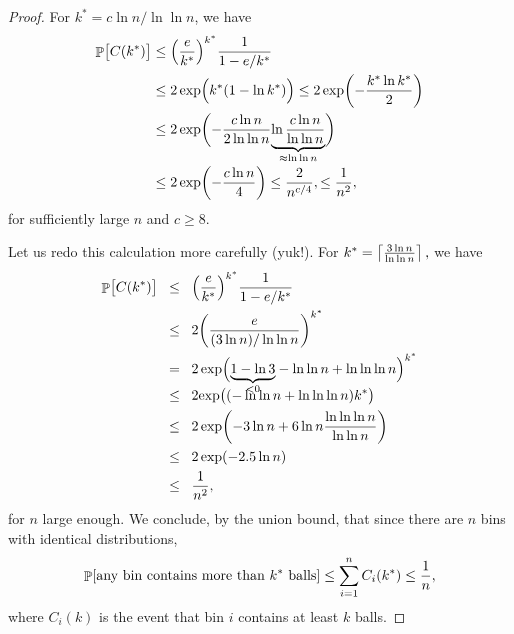 \begin{proof}
    For $k^* = c \ln{n} /\ln \ln n$, we have
    \begin{align*}
      \Prob{\bigl. C\pth{k^*}}%
      &\leq%
        \pth{\bigl.\frac{e}{k^*}}^{k^*} \frac{1}{1-e/{k^*}}%
        \\&\leq%
        2 \exp \pth{\Bigl. k^* \pth{1  - \ln k^* }}
        \leq%
        2 \exp \pth{ - \frac{k^*\ln k^*}{2} }
      \\&%
      \leq%
      2 \exp \pth{ - \frac{c \ln{n}}{2 \ln \ln n}
      \smash{\underbrace{\ln
      \frac{c \ln{n}}{\ln \ln n}}_{\approx \ln \ln n}}}
      \\[0.35cm]&
      \leq %
      2 \exp \pth{ - \frac{c \ln{n}}{4 } }
      \leq %
      \frac{2}{n^{c/4}},
      \leq %
      \frac{1}{n^{2}},
    \end{align*}
    for sufficiently large $n$ and $c\geq 8$. %

    Let us redo this calculation more carefully (yuk!). For
    \begin{math}
        k^* = \left\lceil {
           \tfrac{3 \ln n }{\ln \ln n}
           } \right\rceil,
    \end{math}
    we have
    \begin{align*}
        \Prob{\bigl. C\pth{k^*}}%
        &\LEQ%
        \pth{\frac{e}{k^*}}^{k^*} \frac{1}{1-e/{k^*}}%
        \\&
        \LEQ%
        2 \pth[]{\frac{e}{(3 \ln{n})/\ln \ln n}}^{k^*}%
        \\&
        \EQ%
        2  \,{ \bigl. \exp\pth{\Bigl.
              \smash{\underbrace{1- \ln 3}_{<0}} - \ln \ln {n} + \ln \ln
              \ln {n}}}^{k^*}%
        \\&%
        \LEQ%
        2 \bigl.\exp \pth{\bigl. \pth{ - \ln \ln {n} + \ln \ln \ln
              {n}}{k^*}}
        \\&
        \LEQ%
        2 \exp \pth{-3 \ln n + {6 \ln n} \frac{\ln \ln \ln n}{\ln \ln n}}
        \\&%
        \LEQ%
        2\exp \pth{ -2.5 \ln n}
        \\&
        \LEQ%
        \frac{1}{n^2},
    \end{align*}
    for $n$ large enough. We conclude, by the union bound, that since
    there are $n$ bins with identical distributions,
    \begin{equation*}
        \Prob{\MakeBig \text{any bin contains more than $k^*$
              balls}} %
        \leq%
        \sum_{i=1}^{n} C_{i}\pth{k^*}%
        \leq%
        \frac{1}{n},
    \end{equation*}
    where $C_i(k)$ is the event that bin $i$ contains at least $k$ balls.
\end{proof}


